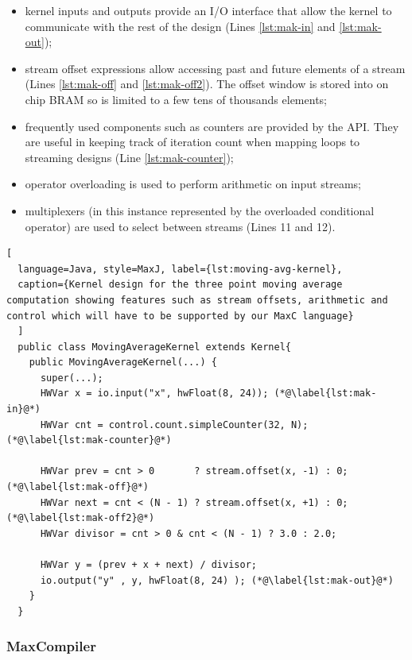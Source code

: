 \begin{itemize}

\item kernel inputs and outputs provide an I/O interface that allow
  the kernel to communicate with the rest of the design (Lines
  \ref{lst:mak-in} and \ref{lst:mak-out});

\item stream offset expressions allow accessing past and future
  elements of a stream (Lines \ref{lst:mak-off} and
  \ref{lst:mak-off2}). The offset window is stored into on chip BRAM
  so is limited to a few tens of thousands elements;

\item frequently used components such as counters are provided by the
  API. They are useful in keeping track of iteration count when
  mapping loops to streaming designs (Line \ref{lst:mak-counter});

\item operator overloading is used to perform arithmetic on input streams;

\item multiplexers (in this instance represented by the overloaded
  conditional operator) are used to select between streams (Lines 11
  and 12).

\end{itemize}

\begin{lstlisting}[
  language=Java, style=MaxJ, label={lst:moving-avg-kernel},
  caption={Kernel design for the three point moving average computation showing features such as stream offsets, arithmetic and control which will have to be supported by our MaxC language}
  ]
  public class MovingAverageKernel extends Kernel{
    public MovingAverageKernel(...) {
      super(...);
      HWVar x = io.input("x", hwFloat(8, 24)); (*@\label{lst:mak-in}@*)
      HWVar cnt = control.count.simpleCounter(32, N); (*@\label{lst:mak-counter}@*)

      HWVar prev = cnt > 0       ? stream.offset(x, -1) : 0; (*@\label{lst:mak-off}@*)
      HWVar next = cnt < (N - 1) ? stream.offset(x, +1) : 0; (*@\label{lst:mak-off2}@*)
      HWVar divisor = cnt > 0 & cnt < (N - 1) ? 3.0 : 2.0;

      HWVar y = (prev + x + next) / divisor;
      io.output("y" , y, hwFloat(8, 24) ); (*@\label{lst:mak-out}@*)
    }
  }
\end{lstlisting}

\subsubsection{MaxCompiler}

